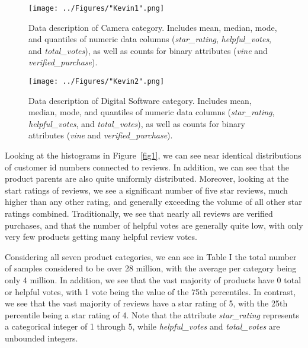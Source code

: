 \documentclass[10pt, conference, compsocconf]{IEEEtran}
\begin{document}
\begin{figure}[htb]
	\centering
	\texttt{[image: ../Figures/"Kevin1".png]}\\
	\vspace{0.04cm}
	\caption{Data description of Camera category. Includes mean, median, mode, and quantiles of numeric data columns (\textit{star\_rating}, \textit{helpful\_votes}, and \textit{total\_votes}), as well as counts for binary attributes (\textit{vine} and \textit{verified\_purchase}).}
	\vspace{0.01cm}
	\label{kev1}
\end{figure}

\begin{figure}[htb]
	\centering
	\texttt{[image: ../Figures/"Kevin2".png]}\\
	\vspace{0.04cm}
	\caption{Data description of Digital Software category. Includes mean, median, mode, and quantiles of numeric data columns (\textit{star\_rating}, \textit{helpful\_votes}, and \textit{total\_votes}), as well as counts for binary attributes (\textit{vine} and \textit{verified\_purchase}).}
	\vspace{0.01cm}
	\label{kev2}
\end{figure}

Looking at the histograms in Figure~\ref{fig1}, we can see near identical distributions of customer id numbers connected to reviews. In addition, we can see that the product parents are also quite uniformly distributed. Moreover, looking at the start ratings of reviews, we see a significant number of five star reviews, much higher than any other rating, and generally exceeding the volume of all other star ratings combined. Traditionally, we see that nearly all reviews are verified purchases, and that the number of helpful votes are generally quite low, with only very few products getting many helpful review votes.

Considering all seven product categories, we can see in Table I the total number of samples considered to be over 28 million, with the average per category being only 4 million. In addition, we see that the vast majority of products have 0 total or helpful votes, with 1 vote being the value of the 75th percentiles. In contrast, we see that the vast majority of reviews have a star rating of 5, with the 25th percentile being a star rating of 4. Note that the attribute \textit{star\_rating} represents a categorical integer of 1 through 5, while \textit{helpful\_votes} and \textit{total\_votes} are unbounded integers. 
\end{document}
